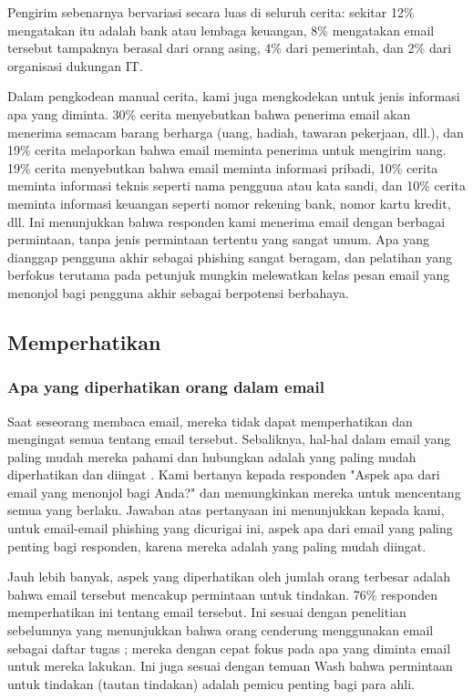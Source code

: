 \documentclass[lettersize,journal]{IEEEtran}
\begin{document}
Pengirim sebenarnya bervariasi secara luas di seluruh cerita: sekitar 12\%
mengatakan itu adalah bank atau lembaga keuangan, 8\% mengatakan email tersebut
tampaknya berasal dari orang asing, 4\% dari pemerintah, dan 2\% dari
organisasi dukungan IT.

Dalam pengkodean manual cerita, kami juga mengkodekan untuk jenis informasi apa
yang diminta. 30\% cerita menyebutkan bahwa penerima email akan menerima
semacam barang berharga (uang, hadiah, tawaran pekerjaan, dll.), dan 19\%
cerita melaporkan bahwa email meminta penerima untuk mengirim uang. 19\% cerita
menyebutkan bahwa email meminta informasi pribadi, 10\% cerita meminta
informasi teknis seperti nama pengguna atau kata sandi, dan 10\% cerita meminta
informasi keuangan seperti nomor rekening bank, nomor kartu kredit, dll. Ini
menunjukkan bahwa responden kami menerima email dengan berbagai permintaan,
tanpa jenis permintaan tertentu yang sangat umum. Apa yang dianggap pengguna
akhir sebagai phishing sangat beragam, dan pelatihan yang berfokus terutama
pada petunjuk mungkin melewatkan kelas pesan email yang menonjol bagi pengguna
akhir sebagai berpotensi berbahaya.

\subsection{Memperhatikan}

\subsubsection{Apa yang diperhatikan orang dalam email}

Saat seseorang membaca email, mereka tidak dapat memperhatikan dan mengingat
semua tentang email tersebut. Sebaliknya, hal-hal dalam email yang paling mudah
mereka pahami dan hubungkan adalah yang paling mudah diperhatikan dan diingat
\cite{satudelapan}. Kami bertanya kepada responden "Aspek apa dari email yang
menonjol bagi Anda?" dan memungkinkan mereka untuk mencentang semua yang
berlaku. Jawaban atas pertanyaan ini menunjukkan kepada kami, untuk email-email
phishing yang dicurigai ini, aspek apa dari email yang paling penting bagi
responden, karena mereka adalah yang paling mudah diingat.

Jauh lebih banyak, aspek yang diperhatikan oleh jumlah orang terbesar adalah
bahwa email tersebut mencakup permintaan untuk tindakan. 76\% responden
memperhatikan ini tentang email tersebut. Ini sesuai dengan penelitian
sebelumnya yang menunjukkan bahwa orang cenderung menggunakan email sebagai
daftar tugas \cite{tigaenam}; mereka dengan cepat fokus pada apa yang diminta
email untuk mereka lakukan. Ini juga sesuai dengan temuan Wash \cite{tigaempat}
bahwa permintaan untuk tindakan (tautan tindakan) adalah pemicu penting bagi
para ahli.
\end{document}
